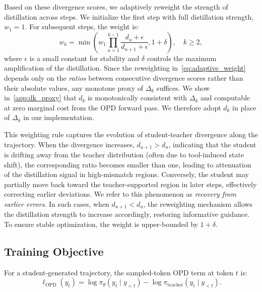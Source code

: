 Based on these divergence scores, we adaptively reweight the strength of distillation across steps.
We initialize the first step with full distillation strength, \ie $w_1 = 1$. For subsequent steps, the weight is:
\begin{equation}
    w_k =
    \min\!\left(
    w_1
    \prod_{u=1}^{k-1}
    \frac{d_u + \epsilon}{d_{u+1} + \epsilon},
    1 + \delta
    \right),
    \quad k \ge 2,
\label{eq:adaptive_weight}
\end{equation}
where $\epsilon$ is a small constant for stability and $\delta$ controls the maximum amplification of the distillation.
Since the reweighting in~\cref{eq:adaptive_weight} depends only on the \emph{ratios} between consecutive divergence scores rather than their absolute values, any monotone proxy of $\Delta_k$ suffices. We show in~\cref{app:dk_proxy} that $d_k$ is monotonically consistent with $\Delta_k$ and computable at zero marginal cost from the OPD forward pass. We therefore adopt $d_k$ in place of $\Delta_k$ in our implementation.



This weighting rule captures the evolution of student-teacher divergence along the trajectory. When the divergence increases, \ie $d_{u+1} > d_u$, indicating that the student is drifting away from the teacher distribution (often due to tool-induced state shift), the corresponding ratio becomes smaller than one, leading to attenuation of the distillation signal in high-mismatch regions. 
Conversely, the student may partially move back toward the teacher-supported region in later steps, effectively correcting earlier deviations. We refer to this phenomenon as \textit{recovery from earlier errors}. In such cases, when $d_{u+1} < d_u$, the reweighting mechanism allows the distillation strength to increase accordingly, restoring informative guidance. To ensure stable optimization, the weight is upper-bounded by $1+\delta$.





\subsection{Training Objective}

For a student-generated trajectory, the sampled-token OPD term at token $t$ is:
\begin{equation}
    \ell_{\mathrm{OPD}}(y_t)
    =
    \log \pi_\theta(y_t \mid y_{<t})
    -
    \log \pi_{\mathrm{teacher}}(y_t \mid y_{<t}).
\end{equation}


